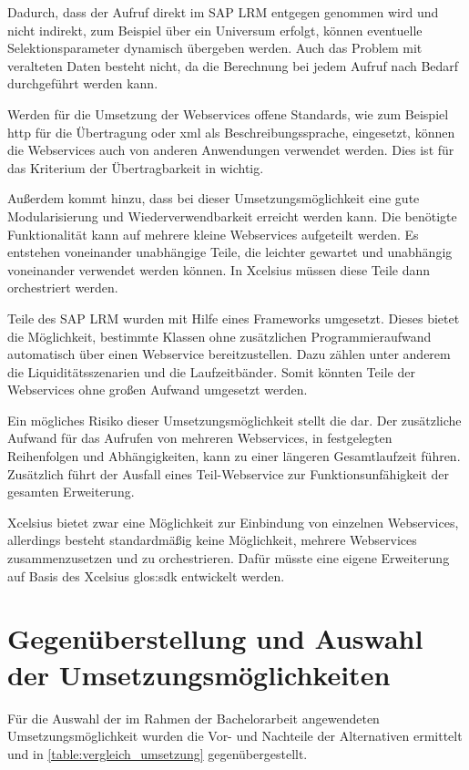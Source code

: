 \begin{onehalfspacing}
Dadurch, dass der Aufruf direkt im SAP LRM entgegen genommen wird und nicht indirekt, zum Beispiel über ein Universum erfolgt, können eventuelle Selektionsparameter dynamisch übergeben werden. Auch das Problem mit veralteten Daten besteht nicht, da die Berechnung bei jedem Aufruf nach Bedarf durchgeführt werden kann.

Werden für die Umsetzung der Webservices offene Standards, wie zum Beispiel \gls{http} für die Übertragung oder \gls{xml} als Beschreibungssprache,  eingesetzt, können die Webservices auch von anderen Anwendungen verwendet werden. Dies ist für das Kriterium der Übertragbarkeit in  wichtig.

Außerdem kommt hinzu, dass bei dieser Umsetzungsmöglichkeit eine gute Modularisierung und Wiederverwendbarkeit erreicht werden kann. Die benötigte Funktionalität kann auf mehrere kleine Webservices aufgeteilt werden. Es entstehen voneinander unabhängige Teile, die leichter gewartet und unabhängig voneinander verwendet werden können. In \gls{Xcelsius} müssen diese Teile dann orchestriert werden.

Teile des SAP LRM wurden mit Hilfe eines Frameworks umgesetzt. Dieses bietet die Möglichkeit, bestimmte Klassen ohne zusätzlichen Programmieraufwand automatisch über einen Webservice bereitzustellen. Dazu zählen unter anderem die Liquiditätsszenarien und die Laufzeitbänder. Somit könnten Teile der Webservices ohne großen Aufwand umgesetzt werden.

Ein mögliches Risiko dieser Umsetzungsmöglichkeit stellt die  dar. Der zusätzliche Aufwand für das Aufrufen von mehreren Webservices, in festgelegten Reihenfolgen und Abhängigkeiten, kann zu einer längeren Gesamtlaufzeit führen. Zusätzlich führt der Ausfall eines Teil-Webservice zur Funktionsunfähigkeit der gesamten Erweiterung.

\gls{Xcelsius} bietet zwar eine Möglichkeit zur Einbindung von einzelnen Webservices, allerdings besteht standardmäßig keine Möglichkeit, mehrere Webservices zusammenzusetzen und zu orchestrieren. Dafür müsste eine eigene Erweiterung auf Basis des \gls{Xcelsius} \gls{glos:sdk} entwickelt werden.

\section{Gegenüberstellung und Auswahl der Umsetzungsmöglichkeiten}
Für die Auswahl der im Rahmen der Bachelorarbeit angewendeten Umsetzungsmöglichkeit wurden die Vor- und Nachteile der Alternativen ermittelt und in \vref{table:vergleich_umsetzung} gegenübergestellt.


\end{onehalfspacing}
